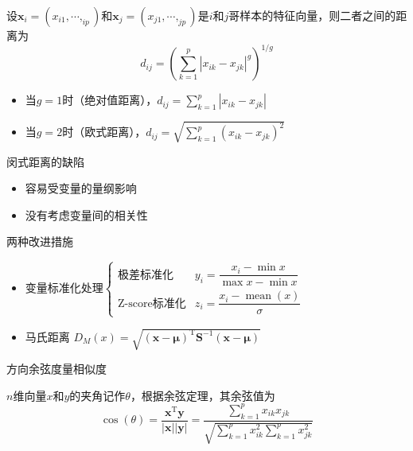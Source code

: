 \begin{definition}[闵可夫斯基距离]
    设$\boldsymbol{x}_{i} = \left( x_{i1},\cdots,_{ip} \right)$和$\boldsymbol{x}_{j} = \left( x_{j1},\cdots,_{jp} \right)$是$i$和$j$哥样本的特征向量，则二者之间的距离为
    \[
        d_{ij} = \left( \sum\limits_{k = 1}^{p}|x_{ik}-x_{jk}|^{g} \right)^{1/g}
    \]
    \begin{itemize}
        \item 当$g = 1$时（绝对值距离），$d_{ij} = \sum\limits_{k = 1}^{p}|x_{ik}-x_{jk}|$
        \item 当$g = 2$时（欧式距离），$d_{ij} = \sqrt{\sum\limits_{k = 1}^{p}\left( x_{ik}-x_{jk} \right)^2}$
    \end{itemize}
\end{definition}
\begin{note}
    闵式距离的缺陷
    \begin{itemize}
        \item 容易受变量的量纲影响
        \item 没有考虑变量间的相关性
    \end{itemize}
\end{note}
\begin{note}
    两种改进措施
    \begin{itemize}
        \item $\text{变量标准化处理}\left\{ \begin{array}{ll}
            \text{极差标准化} & y_i = \dfrac{x_{i}-\min x}{\max x-\min x} \\
            \text{Z-score标准化} & z_i = \dfrac{x_i-\operatorname{mean}(x)}{\sigma}
        \end{array} \right.$
        \item 马氏距离 $ D_{M}(x) = \sqrt{\left( \boldsymbol{x}-\boldsymbol{\mu} \right)^{\mathrm{T}}\boldsymbol{S}^{-1}\left( \boldsymbol{x}-\boldsymbol{\mu} \right)}$
    \end{itemize}
\end{note}
\textcolor{main1}{方向余弦度量相似度}
\begin{definition}[方向余弦]
    $n$维向量$x$和$y$的夹角记作$\theta$，根据余弦定理，其余弦值为
    \[
        \cos (\theta) = \dfrac{\boldsymbol{x}^{\mathrm{T}}\boldsymbol{y}}{|\boldsymbol{x}||\boldsymbol{y}|} = \dfrac{\sum\limits_{k = 1}^{p}x_{ik}x_{jk}}{\sqrt{\sum\limits_{k = 1}^{p}x_{ik}^2 \sum\limits_{k = 1}^{p}x_{jk}^2}}
    \]
\end{definition}

